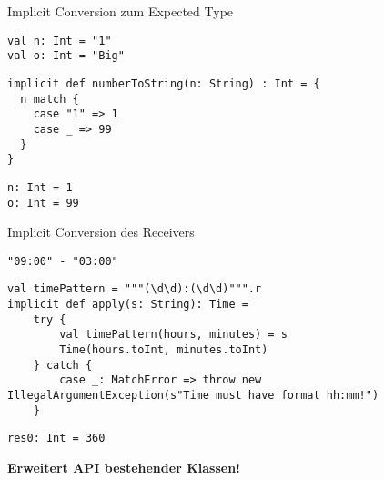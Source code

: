 \documentclass[14pt,aspectratio=169,trans]{beamer} %
\begin{document}
\begin{frame}[fragile]{}
	\begin{block}{Implicit Conversion zum Expected Type}
		\scriptsize
		\onslide<2->
  \begin{lstlisting}
val n: Int = "1"
val o: Int = "Big"
	\end{lstlisting}
\begin{lstlisting}[firstnumber=3]
implicit def numberToString(n: String) : Int = {
  n match {
    case "1" => 1
    case _ => 99
  }
}
\end{lstlisting}
\begin{lstlisting}[firstnumber=9]
n: Int = 1
o: Int = 99
\end{lstlisting}
	\end{block}
\end{frame}

\begin{frame}[fragile]{}
	\begin{block}{Implicit Conversion des Receivers}
		\scriptsize
		\onslide<2->
  \begin{lstlisting}
"09:00" - "03:00"
	\end{lstlisting}
\begin{lstlisting}[firstnumber=2]
val timePattern = """(\d\d):(\d\d)""".r
implicit def apply(s: String): Time =
	try {
		val timePattern(hours, minutes) = s
		Time(hours.toInt, minutes.toInt)
	} catch {
		case _: MatchError => throw new IllegalArgumentException(s"Time must have format hh:mm!")
	}
\end{lstlisting}
\begin{lstlisting}[firstnumber=10]
res0: Int = 360
\end{lstlisting}
\normalsize{\textbf{Erweitert API bestehender Klassen!}}
	\end{block}
\end{frame}
\end{document}
